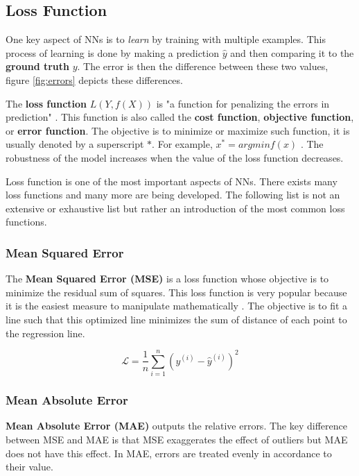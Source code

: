 \subsection{Loss Function}

One key aspect of NNs is to \textit{learn} by training with multiple examples. This process of learning is done by making a prediction $\hat{y}$ and then comparing it to the \textbf{ground truth} $y$. The error is then the difference between these two values, figure \ref{fig:errors} depicts these differences. 

The \textbf{loss function} $L(Y, f(X))$ is "a function for penalizing the errors in prediction" \cite{Hastie2009ElementsLearning}. This function is also called the \textbf{cost function}, \textbf{objective function}, or \textbf{error function}. The objective is to minimize or maximize such function, it is usually denoted by a superscript $\ast$. For example, $x^{\ast}= arg min f(x)$ \cite{Goodfellow.Ian2016DeepLearning}. The robustness of the model increases when the value of the loss function decreases. \cite{LossChanghau}


Loss function is one of the most important aspects of NNs. There exists many loss functions and many more are being developed. The following list is not an extensive or exhaustive list but rather an introduction of the most common loss functions.

\subsubsection{Mean Squared Error}
The \textbf{Mean Squared Error (MSE)} is a loss function whose objective is to minimize the residual sum of squares. This loss function is very popular because it is the easiest measure to manipulate mathematically \cite{Witten2011DataTechniques}. The objective is to fit a line such that this optimized line minimizes the sum of distance of each point to the regression line.

\begin{equation} \label{eq:loss-mse}
	\boldsymbol{\mathcal{L}}=\frac{1}{n}\sum_{i=1}^{n}(y^{(i)}-\hat{y}^{(i)})^{2}
\end{equation}

\subsubsection{Mean Absolute Error}
\textbf{Mean Absolute Error (MAE)} outputs the relative errors. The key difference between MSE and MAE is that MSE exaggerates the effect of outliers but MAE does not have this effect. In MAE, errors are treated evenly in accordance to their value. \cite{Witten2011DataTechniques}

